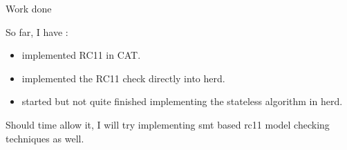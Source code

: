 \documentclass[dvipsnames,svgnames,beamer, 14pt]{beamer}
\begin{document}
\begin{frame}{Work done}

	So far, I have :
	\begin{itemize}
		\item implemented RC11 in CAT.
		\item implemented the RC11 check directly into herd.
		\item started but not quite finished implementing the stateless algorithm in herd.
	\end{itemize}
	\vfill
	Should time allow it, I will try implementing smt based rc11 model checking techniques as well.

\end{frame}
\end{document}
